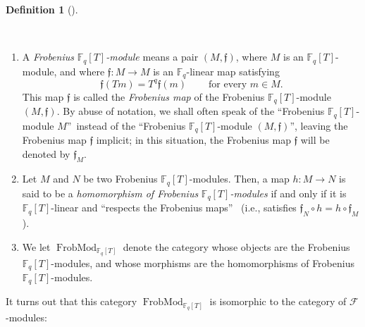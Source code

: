 \documentclass[numbers=enddot,12pt,final,onecolumn,notitlepage]{scrartcl}%
\theoremstyle{definition}
\newtheorem{defi}[theo]{Definition}
\newenvironment{definition}[1][]
{\begin{defi}[#1]\begin{leftbar}}
{\end{leftbar}\end{defi}}
\begin{document}
\begin{definition}
\label{def.F.frobmod}\ \ 

\begin{enumerate}
\item[\textbf{(a)}] A \textit{Frobenius }$\mathbb{F}_{q}\left[  T\right]
$\textit{-module} means a pair $\left(  M,\mathfrak{f}\right)  $, where $M$ is
an $\mathbb{F}_{q}\left[  T\right]  $-module, and where $\mathfrak{f}%
:M\rightarrow M$ is an $\mathbb{F}_{q}$-linear map satisfying%
\begin{equation}
\mathfrak{f}\left(  Tm\right)  =T^{q}\mathfrak{f}\left(  m\right)
\ \ \ \ \ \ \ \ \ \ \text{for every }m\in M. \label{eq.def.F.frobmod.axiom}%
\end{equation}
This map $\mathfrak{f}$ is called the \textit{Frobenius map} of the Frobenius
$\mathbb{F}_{q}\left[  T\right]  $-module $\left(  M,\mathfrak{f}\right)  $.
By abuse of notation, we shall often speak of the \textquotedblleft Frobenius
$\mathbb{F}_{q}\left[  T\right]  $-module $M$\textquotedblright\ instead of
the \textquotedblleft Frobenius $\mathbb{F}_{q}\left[  T\right]  $-module
$\left(  M,\mathfrak{f}\right)  $\textquotedblright, leaving the Frobenius map
$\mathfrak{f}$ implicit; in this situation, the Frobenius map $\mathfrak{f}$
will be denoted by $\mathfrak{f}_{M}$.

\item[\textbf{(b)}] Let $M$ and $N$ be two Frobenius $\mathbb{F}_{q}\left[
T\right]  $-modules. Then, a map $h:M\rightarrow N$ is said to be a
\textit{homomorphism of Frobenius }$\mathbb{F}_{q}\left[  T\right]
$\textit{-modules} if and only if it is $\mathbb{F}_{q}\left[  T\right]
$-linear and \textquotedblleft respects the Frobenius maps\textquotedblright%
\ (i.e., satisfies $\mathfrak{f}_{N}\circ h=h\circ\mathfrak{f}_{M}$).

\item[\textbf{(c)}] We let $\operatorname*{FrobMod}\nolimits_{\mathbb{F}%
_{q}\left[  T\right]  }$ denote the category whose objects are the Frobenius
$\mathbb{F}_{q}\left[  T\right]  $-modules, and whose morphisms are the
homomorphisms of Frobenius $\mathbb{F}_{q}\left[  T\right]  $-modules.
\end{enumerate}
\end{definition}

It turns out that this category $\operatorname*{FrobMod}\nolimits_{\mathbb{F}%
_{q}\left[  T\right]  }$ is isomorphic to the category of $\mathcal{F}$-modules:
\end{document}
